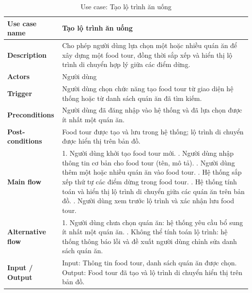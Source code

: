\begingroup
\renewcommand{\arraystretch}{1.25}
\begin{longtable}{|p{4cm}|p{10cm}|}
\caption{Use case: Tạo lộ trình ăn uống} \\
\endfirsthead

\endhead

\endfoot

\endlastfoot

\hline

\textbf{Use case name} &
Tạo lộ trình ăn uống \\
\hline

\textbf{Description} &
Cho phép người dùng lựa chọn một hoặc nhiều quán ăn để xây dựng một food tour, đồng thời sắp xếp và hiển thị lộ trình di chuyển hợp lý giữa các điểm dừng. \\
\hline

\textbf{Actors} &
Người dùng \\
\hline

\textbf{Trigger} &
Người dùng chọn chức năng tạo food tour từ giao diện hệ thống hoặc từ danh sách quán ăn đã tìm kiếm. \\
\hline

\textbf{Preconditions} &
Người dùng đã đăng nhập vào hệ thống và đã lựa chọn được ít nhất một quán ăn. \\
\hline

\textbf{Post-conditions} &
Food tour được tạo và lưu trong hệ thống; lộ trình di chuyển được hiển thị trên bản đồ. \\
\hline

\textbf{Main flow} &
1. Người dùng khởi tạo food tour mới. \newline 2. Người dùng nhập thông tin cơ bản cho food tour (tên, mô tả). \newline 3. Người dùng thêm một hoặc nhiều quán ăn vào food tour. \newline 4. Hệ thống sắp xếp thứ tự các điểm dừng trong food tour. \newline 5. Hệ thống tính toán và hiển thị lộ trình di chuyển giữa các quán ăn trên bản đồ. \newline 6. Người dùng xem trước lộ trình và xác nhận lưu food tour. \\
\hline

\textbf{Alternative flow} &
1. Người dùng chưa chọn quán ăn: hệ thống yêu cầu bổ sung ít nhất một quán ăn. \newline 2. Không thể tính toán lộ trình: hệ thống thông báo lỗi và đề xuất người dùng chỉnh sửa danh sách quán ăn. \\
\hline

\textbf{Input / Output} &
Input: Thông tin food tour, danh sách quán ăn được chọn. \newline Output: Food tour đã tạo và lộ trình di chuyển hiển thị trên bản đồ. \\
\hline

\end{longtable}
\endgroup


